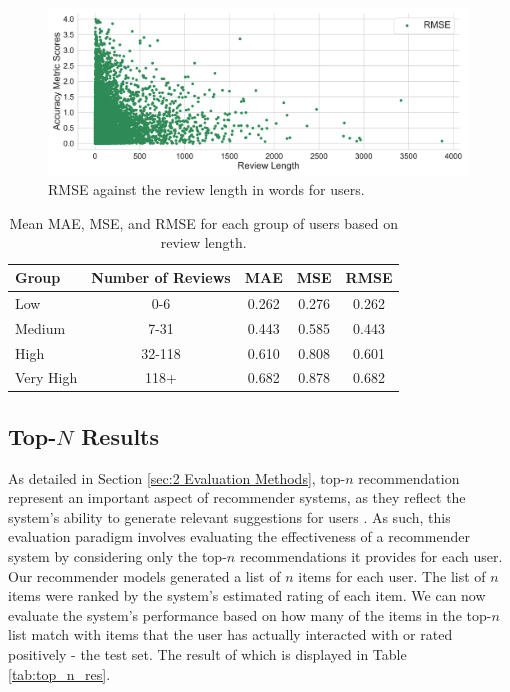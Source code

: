 \begin{figure}[htbp]
    \centering
    \includegraphics[width=0.99\textwidth]{Figures/ncf_length_ratings_metrics.pdf}
    \caption{RMSE against the review length in words for users.}
    \label{fig:RMSE_reviews}
\end{figure}


\begin{table}[htbp]
    \centering
    \begin{tabular}{lcccc}
        \toprule
        \textbf{Group} & \textbf{Number of Reviews}&\textbf{MAE} & \textbf{MSE} & \textbf{RMSE} \\
        \midrule
        Low & 0-6                 &             0.262 &             0.276 &              0.262 \\
        Medium & 7-31                &             0.443 &             0.585 &              0.443 \\

        High & 32-118              &             0.610   &             0.808 &              0.601   \\

        Very High & 118+                &             0.682 &             0.878 &              0.682 \\

        \bottomrule
    \end{tabular}
    \caption{Mean MAE, MSE, and RMSE for each group of users based on review length.}
    \label{tab:summary_stats_revs}
\end{table}


\subsection{Top-$N$ Results}
\label{subsec:5 Top-N Results}

As detailed in Section \ref{sec:2 Evaluation Methods}, top-$n$ recommendation represent an important aspect of recommender systems, as they reflect the system's ability to generate relevant suggestions for users \cite{lu2012recommender}. As such, this evaluation paradigm involves evaluating the effectiveness of a recommender system by considering only the top-$n$ recommendations it provides for each user. Our recommender models generated a list of $n$ items for each user. The list of $n$ items were ranked by the system's estimated rating  of each item. We can now evaluate the system's performance based on how many of the items in the top-$n$ list match with items that the user has actually interacted with or rated positively - the test set. The result of which is displayed in Table \ref{tab:top_n_res}. 

